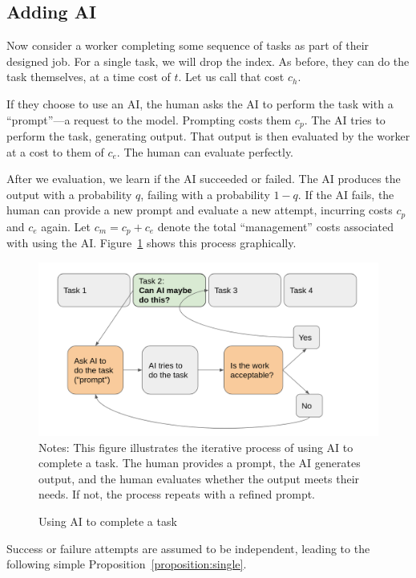 \documentclass{article}
\theoremstyle{plain}
\theoremstyle{plain}
\begin{document}
\subsection{Adding AI} \label{sec:model}
Now consider a worker completing some sequence of tasks as part of their designed job.
For a single task, we will drop the index. 
As before, they can do the task themselves, at a time cost of $t$.
Let us call that cost $c_h$.

If they choose to use an AI, the human asks the AI to perform the task with a ``prompt''---a request to the model. 
Prompting costs them $c_{p}$.
The AI tries to perform the task, generating output.
That output is then evaluated by the worker at a cost to them of $c_{e}$.
The human can evaluate perfectly.

After we evaluation, we learn if the AI succeeded or failed.
The AI produces the output with a probability $q$, failing with a probability $1-q$.
If the AI fails, the human can provide a new prompt and evaluate a new attempt, incurring costs $c_p$ and $c_e$ again.
Let $c_m = c_p + c_e$ denote the total ``management'' costs associated with using the AI.
Figure~\ref{fig:flow} shows this process graphically.

\begin{figure}[h]
  \centering
  \caption{Using AI to complete a task} \label{fig:flow}
  \includegraphics[width = \textwidth]{images/flow.png}
  \footnotesize{Notes: This figure illustrates the iterative process of using AI to complete a task. The human provides a prompt, the AI generates output, and the human evaluates whether the output meets their needs. If not, the process repeats with a refined prompt.}
\end{figure}

Success or failure attempts are assumed to be independent, leading to the following simple Proposition~\ref{proposition:single}.
\end{document}
